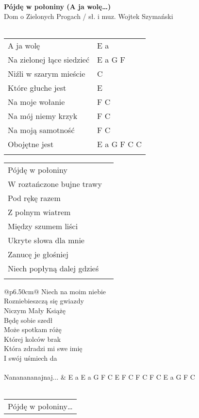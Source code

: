 \documentclass[a5paper]{article}
\begin{document}


\noindent
\fontsize{12pt}{15pt}\selectfont
\textbf{Pójdę w połoniny (A ja wolę…)} \\
\fontsize{8pt}{10pt}\selectfont
Dom o Zielonych Progach / sł. i muz. Wojtek Szymański \\ \\
\fontsize{10pt}{12pt}\selectfont
{}
\begin{tabular}{@{}p{6.50cm}p{3cm}@{}}
\noindent
A ja wolę & E a \\
Na zielonej łące siedzieć & E a G F \\
Niźli w szarym mieście & C \\
Które głuche jest & E \\
Na moje wołanie & F C \\
Na mój niemy krzyk & F C \\
Na moją samotność & F C \\
Obojętne jest & E a G F C C \\ \\
\end{tabular}

\noindent
\begin{tabular}{@{}p{5.50cm}p{3cm}@{}}
Pójdę w połoniny \\
W roztańczone bujne trawy \\
Pod rękę razem \\
Z polnym wiatrem \\
Między szumem liści \\
Ukryte słowa dla mnie \\
Zanucę je głośniej \\
Niech popłyną dalej gdzieś \\ \\
\end{tabular}

\noindent
\begin{tabular}{@{}p{6.50cm}@{}}
Niech na moim niebie \\
Rozniebieszczą się gwiazdy \\
Niczym Mały Książę \\
Będę sobie szedł \\
Może spotkam różę \\
Której kolców brak \\
Która zdradzi mi swe imię \\
I swój uśmiech da \\ \\

Nananananajnaj... & E a E a G F C E F C F C F C E a G F C \\ \\
\end{tabular}

\noindent
\begin{tabular}{@{}p{5.50cm}@{}}
Pójdę w połoniny…
\end{tabular}
\end{document}
